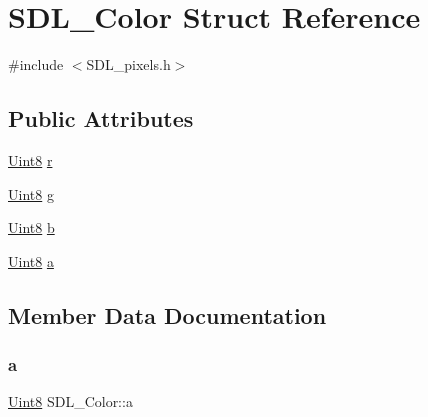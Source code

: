 \hypertarget{struct_s_d_l___color}{}\section{S\+D\+L\+\_\+\+Color Struct Reference}
\label{struct_s_d_l___color}


{\ttfamily \#include $<$S\+D\+L\+\_\+pixels.\+h$>$}

\subsection*{Public Attributes}
\begin{DoxyCompactItemize}
\item 
\mbox{\hyperlink{_s_d_l__stdinc_8h_a2944638813a090aa23e62f4da842c3e2}{Uint8}} \mbox{\hyperlink{struct_s_d_l___color_a0bb975b6829524133fdd3c6060cfa63d}{r}}
\item 
\mbox{\hyperlink{_s_d_l__stdinc_8h_a2944638813a090aa23e62f4da842c3e2}{Uint8}} \mbox{\hyperlink{struct_s_d_l___color_ae29d881bf740cfa7078b36e07f85d298}{g}}
\item 
\mbox{\hyperlink{_s_d_l__stdinc_8h_a2944638813a090aa23e62f4da842c3e2}{Uint8}} \mbox{\hyperlink{struct_s_d_l___color_a3b79a27e0414049559aa5bcf241dedd3}{b}}
\item 
\mbox{\hyperlink{_s_d_l__stdinc_8h_a2944638813a090aa23e62f4da842c3e2}{Uint8}} \mbox{\hyperlink{struct_s_d_l___color_ac497ba67af6ecb4d51bdd0945b314526}{a}}
\end{DoxyCompactItemize}


\subsection{Member Data Documentation}
\mbox{\label{struct_s_d_l___color_ac497ba67af6ecb4d51bdd0945b314526}} 
\subsubsection{\texorpdfstring{a}{a}}
{\footnotesize\ttfamily \mbox{\hyperlink{_s_d_l__stdinc_8h_a2944638813a090aa23e62f4da842c3e2}{Uint8}} S\+D\+L\+\_\+\+Color\+::a}

\mbox{\label{struct_s_d_l___color_a3b79a27e0414049559aa5bcf241dedd3}} 
